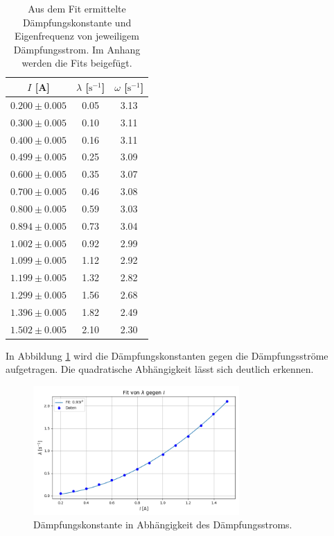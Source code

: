 \documentclass{article}
\begin{document}
\begin{table}[H]
    \centering
    \begin{tabular}{c|c|c}
        \toprule
        $I$ [A] & $\lambda$ [$\text{s}^{-1}$] & $\omega$ [$\text{s}^{-1}$] \\
        \midrule
        $0.200\pm0.005$ & 0.05 & 3.13 \\
        $0.300\pm0.005$ & 0.10 & 3.11 \\
        $0.400\pm0.005$ & 0.16 & 3.11 \\
        $0.499\pm0.005$ & 0.25 & 3.09 \\
        $0.600\pm0.005$ & 0.35 & 3.07 \\
        $0.700\pm0.005$ & 0.46 & 3.08 \\
        $0.800\pm0.005$ & 0.59 & 3.03 \\
        $0.894\pm0.005$ & 0.73 & 3.04 \\
        $1.002\pm0.005$ & 0.92 & 2.99 \\
        $1.099\pm0.005$ & 1.12 & 2.92 \\
        $1.199\pm0.005$ & 1.32 & 2.82 \\
        $1.299\pm0.005$ & 1.56 & 2.68 \\
        $1.396\pm0.005$ & 1.82 & 2.49 \\
        $1.502\pm0.005$ & 2.10 & 2.30 \\
        \bottomrule
    \end{tabular}
    \caption{Aus dem Fit ermittelte Dämpfungskonstante und Eigenfrequenz von jeweiligem Dämpfungsstrom. Im Anhang werden die Fits beigefügt.}
    \label{tab:fit}
\end{table}
In Abbildung \ref{fig:Dämpfungskonstante} wird die Dämpfungskonstanten gegen die Dämpfungsströme aufgetragen. Die quadratische Abhängigkeit lässt sich deutlich erkennen.

\begin{figure}[H]
    \centering
    \includegraphics[width=0.7\textwidth]{Figure_8.png}
    \caption{Dämpfungskonstante in Abhängigkeit des Dämpfungsstroms.}
    \label{fig:Dämpfungskonstante}
\end{figure}
\end{document}
